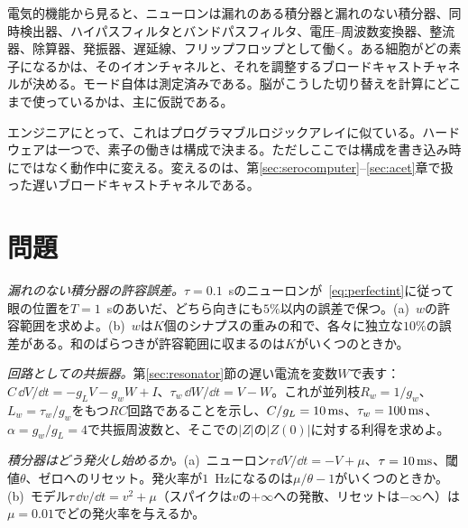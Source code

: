 \begin{keyblock}
\begin{proposition}[1個のニューロンは多くの素子になる]
\label{prop:eetypes}
電気的機能から見ると、ニューロンは漏れのある積分器と漏れのない積分器、同時検出器、ハイパスフィルタとバンドパスフィルタ、電圧--周波数変換器、整流器、除算器、発振器、遅延線、フリップフロップとして働く。ある細胞がどの素子になるかは、そのイオンチャネルと、それを調整するブロードキャストチャネルが決める。モード自体は測定済みである。脳がこうした切り替えを計算にどこまで使っているかは、主に仮説である。
\end{proposition}
\end{keyblock}

エンジニアにとって、これはプログラマブルロジックアレイに似ている。ハードウェアは一つで、素子の働きは構成で決まる。ただしここでは構成を書き込み時にではなく動作中に変える。変えるのは、第\ref{sec:serocomputer}--\ref{sec:acet}章で扱った遅いブロードキャストチャネルである。

\section{問題}

\begin{exercise}[\lvlA]
\label{ex:18:1}
\emph{漏れのない積分器の許容誤差。}$\tau=0.1$~sのニューロンが~\eqref{eq:perfectint}に従って眼の位置を$T=1$~sのあいだ、どちら向きにも$5\%$以内の誤差で保つ。(a)~$w$の許容範囲を求めよ。(b)~$w$は$K$個のシナプスの重みの和で、各々に独立な$10\%$の誤差がある。和のばらつきが許容範囲に収まるのは$K$がいくつのときか。
\end{exercise}

\begin{exercise}[\lvlB]
\label{ex:18:2}
\emph{回路としての共振器。}第\ref{sec:resonator}節の遅い電流を変数$W$で表す：$C\,\dd V/\dd t=-g_LV-g_wW+I$、$\tau_w\,\dd W/\dd t=V-W$。これが並列枝$R_w=1/g_w$、$L_w=\tau_w/g_w$をもつ$RC$回路であることを示し、$C/g_L=10\,\text{ms}$、$\tau_w=100\,\text{ms}$、$\alpha=g_w/g_L=4$で共振周波数と、そこでの$|Z|$の$|Z(0)|$に対する利得を求めよ。
\end{exercise}

\begin{exercise}[\lvlB]
\label{ex:18:3}
\emph{積分器はどう発火し始めるか。}(a)~ニューロン$\tau\,\dd V/\dd t=-V+\mu$、$\tau=10\,\text{ms}$、閾値$\theta$、ゼロへのリセット。発火率が$1$~Hzになるのは$\mu/\theta-1$がいくつのときか。(b)~モデル$\tau\,\dd v/\dd t=v^2+\mu$（スパイクは$v$の$+\infty$への発散、リセットは$-\infty$へ）は$\mu=0.01$でどの発火率を与えるか。
\end{exercise}

